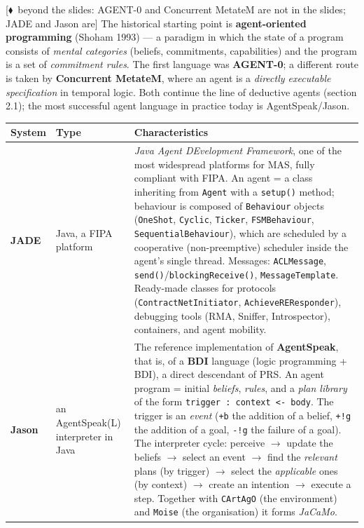 \documentclass[11pt,a4paper]{article}
\theoremstyle{definition}
\newcommand{\mimoq}[1]{\textcolor{markcol}{\textsf{\footnotesize[$\blacklozenge$~beyond the slides: #1]}}}
\begin{document}
\noindent\mimoq{AGENT-0 and Concurrent MetateM are not in the slides; JADE and Jason are}
The historical starting point is \textbf{agent-oriented programming} (Shoham 1993) --- a
paradigm in which the state of a program consists of \emph{mental categories} (beliefs,
commitments, capabilities) and the program is a set of \emph{commitment rules}. The first
language was \textbf{AGENT-0}; a different route is taken by \textbf{Concurrent MetateM}, where
an agent is a \emph{directly executable specification} in temporal logic. Both continue the line
of deductive agents (section 2.1); the most successful agent language in practice today is
AgentSpeak/Jason.
\begin{center}\small
\begin{tabular}{p{} p{} p{}}
\toprule
\textbf{System} & \textbf{Type} & \textbf{Characteristics} \\
\midrule
\textbf{JADE}
  & Java, a FIPA platform
  & \emph{Java Agent DEvelopment Framework}, one of the most widespread platforms for MAS, fully
    compliant with FIPA. An agent = a class inheriting from \texttt{Agent} with a \texttt{setup()}
    method; behaviour is composed of \texttt{Behaviour} objects (\texttt{OneShot}, \texttt{Cyclic},
    \texttt{Ticker}, \texttt{FSMBehaviour}, \texttt{SequentialBehaviour}), which are scheduled by a
    cooperative (non-preemptive) scheduler inside the agent's single thread. Messages:
    \texttt{ACLMessage}, \texttt{send()}/\texttt{blockingReceive()}, \texttt{MessageTemplate}.
    Ready-made classes for protocols (\texttt{ContractNetInitiator}, \texttt{AchieveREResponder}),
    debugging tools (RMA, Sniffer, Introspector), containers, and agent mobility. \\
\textbf{Jason}
  & an AgentSpeak(L) interpreter in Java
  & The reference implementation of \textbf{AgentSpeak}, that is, of a \textbf{BDI} language (logic
    programming + BDI), a direct descendant of PRS. An agent program = initial \emph{beliefs},
    \emph{rules}, and a \emph{plan library} of the form \texttt{trigger : context <- body}. The trigger
    is an \emph{event} (\texttt{+b} the addition of a belief, \texttt{+!g} the addition of a goal,
    \texttt{-!g} the failure of a goal). The interpreter cycle: perceive $\to$ update the beliefs $\to$
    select an event $\to$ find the \emph{relevant} plans (by trigger) $\to$ select the
    \emph{applicable} ones (by context) $\to$ create an intention $\to$ execute a step. Together with
    \texttt{CArtAgO} (the environment) and \texttt{Moise} (the organisation) it forms \emph{JaCaMo}. \\

\end{tabular}
\end{center}
\end{document}
